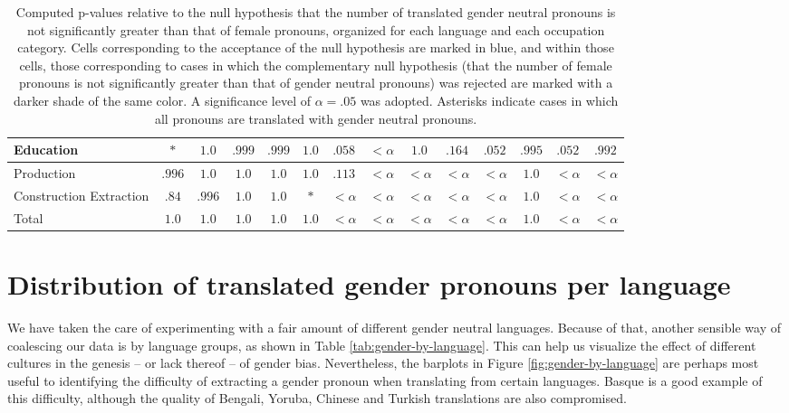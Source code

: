 \documentclass[twoside,11pt]{article}
\begin{document}
\begin{table}[H]
\begin{tabular}{|m{1.75cm}|cccccccccccc|c|}
Education	&	\cellcolor{blue!25}$*$	&	\cellcolor{blue!45}$1.0$	&	\cellcolor{blue!45}$.999$	&	\cellcolor{blue!45}$.999$	&	\cellcolor{blue!45}$1.0$	&	\cellcolor{blue!25}$.058$	&	$<\alpha$	&	\cellcolor{blue!45}$1.0$	&	\cellcolor{blue!25}$.164$	&	\cellcolor{blue!25}$.052$	&	\cellcolor{blue!45}$.995$	&	\cellcolor{blue!25}$.052$	&	\cellcolor{blue!45}$.992$	 \\ \hline 
Production	&	\cellcolor{blue!45}$.996$	&	\cellcolor{blue!45}$1.0$	&	\cellcolor{blue!45}$1.0$	&	\cellcolor{blue!45}$1.0$	&	\cellcolor{blue!45}$1.0$	&	\cellcolor{blue!25}$.113$	&	$<\alpha$	&	$<\alpha$	&	$<\alpha$	&	$<\alpha$	&	\cellcolor{blue!45}$1.0$	&	$<\alpha$	&	$<\alpha$	 \\ \hline 
Construction 
 Extraction	&	\cellcolor{blue!25}$.84$	&	\cellcolor{blue!45}$.996$	&	\cellcolor{blue!45}$1.0$	&	\cellcolor{blue!45}$1.0$	&	\cellcolor{blue!25}$*$	&	$<\alpha$	&	$<\alpha$	&	$<\alpha$	&	$<\alpha$	&	$<\alpha$	&	\cellcolor{blue!45}$1.0$	&	$<\alpha$	&	$<\alpha$	 \\ \hline 
Total	&	\cellcolor{blue!45}$1.0$	&	\cellcolor{blue!45}$1.0$	&	\cellcolor{blue!45}$1.0$	&	\cellcolor{blue!45}$1.0$	&	\cellcolor{blue!45}$1.0$	&	$<\alpha$	&	$<\alpha$	&	$<\alpha$	&	$<\alpha$	&	$<\alpha$	&	\cellcolor{blue!45}$1.0$	&	$<\alpha$	&	$<\alpha$	 \\ \hline 

\end{tabular}
\caption{Computed p-values relative to the null hypothesis that the number of translated gender neutral pronouns is not significantly greater than that of female pronouns, organized for each language and each occupation category. Cells corresponding to the acceptance of the null hypothesis are marked in blue, and within those cells, those corresponding to cases in which the complementary null hypothesis (that the number of female pronouns is not significantly greater than that of gender neutral pronouns) was rejected are marked with a darker shade of the same color. A significance level of $\alpha =.05$ was adopted. Asterisks indicate cases in which all pronouns are translated with gender neutral pronouns.}
\label{tab:pvalues-NF}
\end{table}

\section{Distribution of translated gender pronouns per language}

We have taken the care of experimenting with a fair amount of different gender neutral languages. Because of that, another sensible way of coalescing our data is by language groups, as shown in Table \ref{tab:gender-by-language}. This can help us visualize the effect of different cultures in the genesis -- or lack thereof -- of gender bias. Nevertheless, the barplots in Figure \ref{fig:gender-by-language} are perhaps most useful to identifying the difficulty of extracting a gender pronoun when translating from certain languages. Basque is a good example of this difficulty, although the quality of Bengali, Yoruba, Chinese and Turkish translations are also compromised.
\end{document}
